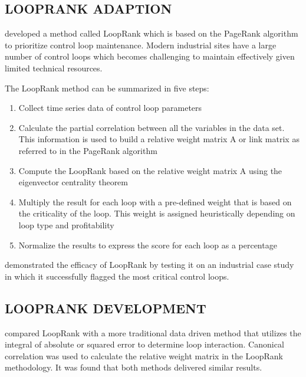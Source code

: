 \subsection{LOOPRANK ADAPTION}

\cite{farenzena2009looprank} developed a method called LoopRank which is based on the PageRank algorithm to prioritize control loop maintenance. Modern industrial sites have a large number of control loops which becomes challenging to maintain effectively given limited technical resources. \par

The LoopRank method can be summarized in five steps:
\begin{enumerate}
	\item Collect time series data of control loop parameters
	\item Calculate the partial correlation between all the variables in the data set. This information is used to build a relative weight matrix A or link matrix as referred to in the PageRank algorithm
	\item Compute the LoopRank based on the relative weight matrix A using the eigenvector centrality theorem
	\item Multiply the result for each loop with a pre-defined weight that is based on the criticality of the loop. This weight is assigned heuristically depending on loop type and profitability
	\item Normalize the results to express the score for each loop as a percentage
\end{enumerate}\par

\cite{farenzena2009looprank} demonstrated the efficacy of LoopRank by testing it on an industrial case study in which it successfully flagged the most critical control loops.\par

\subsection{LOOPRANK DEVELOPMENT}

\cite{rahman2010new} compared LoopRank with a more traditional data driven method that utilizes the integral of absolute or squared error to determine loop interaction. Canonical correlation was used to calculate the relative weight matrix in the LoopRank methodology. It was found that both methods delivered similar results.\par

